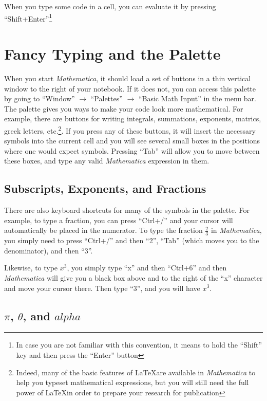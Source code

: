 When you type some code in a cell, you can evaluate it by pressing ``Shift+Enter''\footnote{In case you are not familiar with this convention, it means to hold the ``Shift'' key and then press the ``Enter'' button}

\section{Fancy Typing and the Palette}

When you start \emph{Mathematica}, it should load a set of buttons in a thin vertical window to the right of your notebook. If it does not, you can access this palette by going to ``Window'' $\rightarrow$ ``Palettes'' $\rightarrow$ ``Basic Math Input'' in the menu bar. The palette gives you ways to make your code look more mathematical. For example, there are buttons for writing integrals, summations, exponents, matrics, greek letters, etc.\footnote{Indeed, many of the basic features of \LaTeX are available in \emph{Mathematica} to help you typeset mathematical expressions, but you will still need the full power of \LaTeX in order to prepare your research for publication}. If you press any of these buttons, it will insert the necessary symbols into the current cell and you will see several small boxes in the positions where one would expect symbols. Pressing ``Tab'' will allow you to move between these boxes, and type any valid \emph{Mathematica} expression in them.

\subsection{Subscripts, Exponents, and Fractions}

There are also keyboard shortcuts for many of the symbols in the palette. For example, to type a fraction, you can press ``Ctrl+/'' and your cursor will automatically be placed in the numerator. To type the fraction $\frac{2}{3}$ in \emph{Mathematica}, you simply need to press ``Ctrl+/'' and then ``2'', ``Tab'' (which moves you to the denominator), and then ``3''.

Likewise, to type $x^3$, you simply type ``x'' and then ``Ctrl+6'' and then \emph{Mathematica} will give you a black box above and to the right of the ``x'' character and move your cursor there. Then type ``3'', and you will have $x^3$.

\subsection{$\pi$, $\theta$, and $alpha$}

